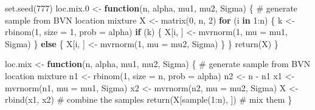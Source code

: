 \documentclass[
  letterpaper,
  DIV=11,
  numbers=noendperiod]{scrreprt}
\newenvironment{Shaded}{\begin{snugshade}}{\end{snugshade}}
\newcommand{\AttributeTok}[1]{\textcolor[rgb]{0.40,0.45,0.13}{#1}}
\newcommand{\CommentTok}[1]{\textcolor[rgb]{0.37,0.37,0.37}{#1}}
\newcommand{\ControlFlowTok}[1]{\textcolor[rgb]{0.00,0.23,0.31}{\textbf{#1}}}
\newcommand{\DecValTok}[1]{\textcolor[rgb]{0.68,0.00,0.00}{#1}}
\newcommand{\FloatTok}[1]{\textcolor[rgb]{0.68,0.00,0.00}{#1}}
\newcommand{\FunctionTok}[1]{\textcolor[rgb]{0.28,0.35,0.67}{#1}}
\newcommand{\NormalTok}[1]{\textcolor[rgb]{0.00,0.23,0.31}{#1}}
\newcommand{\OtherTok}[1]{\textcolor[rgb]{0.00,0.23,0.31}{#1}}
\newcommand{\SpecialCharTok}[1]{\textcolor[rgb]{0.37,0.37,0.37}{#1}}
\begin{document}
\begin{Shaded}
\begin{Highlighting}[]
\FunctionTok{set.seed}\NormalTok{(}\DecValTok{777}\NormalTok{)}
\NormalTok{loc.mix}\FloatTok{.0} \OtherTok{\textless{}{-}} \ControlFlowTok{function}\NormalTok{(n, alpha, mu1, mu2, Sigma) \{}
  \CommentTok{\# generate sample from BVN location mixture}
\NormalTok{  X }\OtherTok{\textless{}{-}} \FunctionTok{matrix}\NormalTok{(}\DecValTok{0}\NormalTok{, n, }\DecValTok{2}\NormalTok{)}
  \ControlFlowTok{for}\NormalTok{ (i }\ControlFlowTok{in} \DecValTok{1}\SpecialCharTok{:}\NormalTok{n) \{}
\NormalTok{    k }\OtherTok{\textless{}{-}} \FunctionTok{rbinom}\NormalTok{(}\DecValTok{1}\NormalTok{, }\AttributeTok{size =} \DecValTok{1}\NormalTok{, }\AttributeTok{prob =}\NormalTok{ alpha)}
    \ControlFlowTok{if}\NormalTok{ (k) \{}
\NormalTok{      X[i, ] }\OtherTok{\textless{}{-}} \FunctionTok{mvrnorm}\NormalTok{(}\DecValTok{1}\NormalTok{, }\AttributeTok{mu =}\NormalTok{ mu1, Sigma)}
\NormalTok{    \} }\ControlFlowTok{else}\NormalTok{ \{}
\NormalTok{      X[i, ] }\OtherTok{\textless{}{-}} \FunctionTok{mvrnorm}\NormalTok{(}\DecValTok{1}\NormalTok{, }\AttributeTok{mu =}\NormalTok{ mu2, Sigma)}
\NormalTok{    \}}
\NormalTok{  \}}
  \FunctionTok{return}\NormalTok{(X)}
\NormalTok{\}}
\end{Highlighting}
\end{Shaded}

\begin{Shaded}
\begin{Highlighting}[]
\NormalTok{loc.mix }\OtherTok{\textless{}{-}} \ControlFlowTok{function}\NormalTok{(n, alpha, mu1, mu2, Sigma) \{}
  \CommentTok{\# generate sample from BVN location mixture}
\NormalTok{  n1 }\OtherTok{\textless{}{-}} \FunctionTok{rbinom}\NormalTok{(}\DecValTok{1}\NormalTok{, }\AttributeTok{size =}\NormalTok{ n, }\AttributeTok{prob =}\NormalTok{ alpha)}
\NormalTok{  n2 }\OtherTok{\textless{}{-}}\NormalTok{ n }\SpecialCharTok{{-}}\NormalTok{ n1}
\NormalTok{  x1 }\OtherTok{\textless{}{-}} \FunctionTok{mvrnorm}\NormalTok{(n1, }\AttributeTok{mu =}\NormalTok{ mu1, Sigma)}
\NormalTok{  x2 }\OtherTok{\textless{}{-}} \FunctionTok{mvrnorm}\NormalTok{(n2, }\AttributeTok{mu =}\NormalTok{ mu2, Sigma)}
\NormalTok{  X }\OtherTok{\textless{}{-}} \FunctionTok{rbind}\NormalTok{(x1, x2) }\CommentTok{\# combine the samples}
  \FunctionTok{return}\NormalTok{(X[}\FunctionTok{sample}\NormalTok{(}\DecValTok{1}\SpecialCharTok{:}\NormalTok{n), ]) }\CommentTok{\# mix them}
\NormalTok{\}}
\end{Highlighting}
\end{Shaded}
\end{document}
